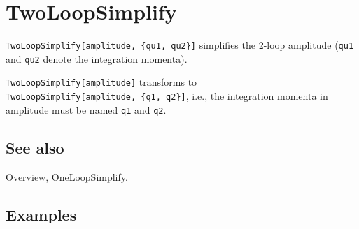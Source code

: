 \documentclass[../FeynCalcManual.tex]{subfiles}
\begin{document}
\hypertarget{twoloopsimplify}{%
\section{TwoLoopSimplify}\label{twoloopsimplify}}

\texttt{TwoLoopSimplify[\allowbreak{}amplitude,\ \allowbreak{}\{\allowbreak{}qu1,\ \allowbreak{}qu2\}]}
simplifies the 2-loop amplitude (\texttt{qu1} and \texttt{qu2} denote
the integration momenta).

\texttt{TwoLoopSimplify[\allowbreak{}amplitude]} transforms to
\texttt{TwoLoopSimplify[\allowbreak{}amplitude,\ \allowbreak{}\{\allowbreak{}q1,\ \allowbreak{}q2\}]},
i.e., the integration momenta in amplitude must be named \texttt{q1} and
\texttt{q2}.

\subsection{See also}

\hyperlink{toc}{Overview}, \hyperlink{oneloopsimplify}{OneLoopSimplify}.

\subsection{Examples}
\end{document}
